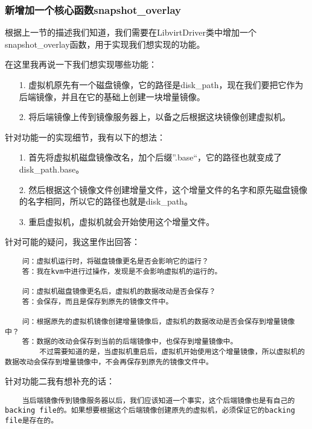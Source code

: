 \documentclass[a4paper,left=1.5cm,right=1.5cm,11pt]{article}
\begin{document}
\subsubsection{新增加一个核心函数snapshot\_overlay}
    根据上一节的描述我们知道，我们需要在LibvirtDriver类中增加一个snapshot\_overlay函数，用于实现我们想实现的功能。\par

    在这里我再说一下我们想实现哪些功能：
    \begin{itemize}
        \item[1.] 虚拟机原先有一个磁盘镜像，它的路径是disk\_path，现在我们要把它作为后端镜像，并且在它的基础上创建一块增量镜像。
        \item[2.] 将后端镜像上传到镜像服务器上，以备之后根据这块镜像创建虚拟机。
    \end{itemize}
    
    针对功能一的实现细节，我有以下的想法：
    \begin{itemize}
        \item[1.] 首先将虚拟机磁盘镜像改名，加个后缀”.base“，它的路径也就变成了disk\_path.base。
        \item[2.] 然后根据这个镜像文件创建增量文件，这个增量文件的名字和原先磁盘镜像的名字相同，所以它的路径也就是disk\_path。
        \item[3.] 重启虚拟机，虚拟机就会开始使用这个增量文件。
    \end{itemize}

    针对可能的疑问，我这里作出回答：
    \begin{lstlisting}
    问：虚拟机运行时，将磁盘镜像更名是否会影响它的运行？
    答：我在kvm中进行过操作，发现是不会影响虚拟机的运行的。

    问：虚拟机磁盘镜像更名后，虚拟机的数据改动是否会保存？
    答：会保存，而且是保存到原先的镜像文件中。

    问：根据原先的虚拟机镜像创建增量镜像后，虚拟机的数据改动是否会保存到增量镜像中？
    答：数据的改动会保存到当前的后端镜像中，也保存到增量镜像中。
        不过需要知道的是，当虚拟机重启后，虚拟机开始使用这个增量镜像，所以虚拟机的数据改动会保存到增量镜像中，不会再保存到原先的镜像文件中。
    \end{lstlisting}

    针对功能二我有想补充的话：
    \begin{lstlisting}
    当后端镜像传到镜像服务器以后，我们应该知道一个事实，这个后端镜像也是有自己的backing file的。如果想要根据这个后端镜像创建原先的虚拟机，必须保证它的backing file是存在的。
    \end{lstlisting}
\end{document}
